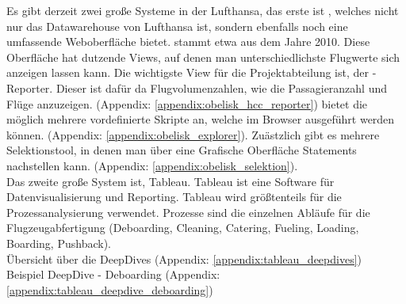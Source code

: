 		Es gibt derzeit zwei große Systeme in der Lufthansa, das erste ist , welches nicht nur das Datawarehouse von Lufthansa ist, sondern ebenfalls noch eine umfassende Weboberfläche bietet.  stammt etwa aus dem Jahre 2010.
		Diese Oberfläche hat dutzende Views, auf denen man unterschiedlichste Flugwerte sich anzeigen lassen kann. Die wichtigste View für die Projektabteilung ist, der -Reporter. Dieser ist dafür da Flugvolumenzahlen, wie die Passagieranzahl und Flüge anzuzeigen.
		(Appendix: \ref{appendix:obelisk_hcc_reporter})
		 bietet die möglich mehrere vordefinierte  Skripte an, welche im Browser ausgeführt werden können. (Appendix: \ref{appendix:obelisk_explorer}).
		Zuästzlich gibt es mehrere Selektionstool, in denen man über eine Grafische Oberfläche  Statements nachstellen kann. (Appendix: \ref{appendix:obelisk_selektion}).\\

		Das zweite große System ist, Tableau. Tableau ist eine Software für Datenvisualisierung und Reporting. Tableau wird größtenteils für die Prozessanalysierung verwendet. Prozesse sind die einzelnen Abläufe für die Flugzeugabfertigung (Deboarding, Cleaning, Catering, Fueling, Loading, Boarding, Pushback).\\
		
		Übersicht über die DeepDives (Appendix: \ref{appendix:tableau_deepdives})\\
		Beispiel DeepDive - Deboarding (Appendix: \ref{appendix:tableau_deepdive_deboarding})